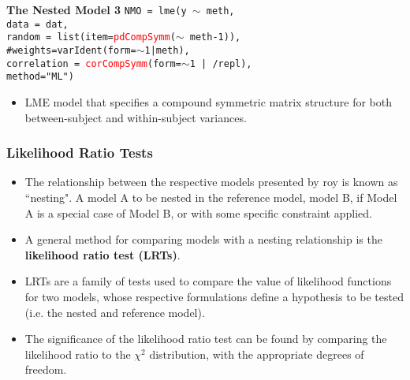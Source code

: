 \documentclass[compress]{beamer}        %
\makeatletter
\newcommand{\tcb}{\textcolor{beamer@blendedblue}}
\newcommand{\tcr}{\textcolor{red}}
\makeatother
\begin{document}
\begin{frame}[fragile]{\bf \tcb{The Nested Model 3}}
\texttt{NMO = lme(y $\sim$ meth,\\
   \hspace{0.6cm} data = dat,\\
   \hspace{0.6cm} random = list(item=\tcr{pdCompSymm}($\sim$ meth-1)), \\
   \hspace{0.6cm} \tcb{\#weights=varIdent(form=$\sim$1|meth),}\\
   \hspace{0.6cm} correlation = \tcr{corCompSymm}(form=$\sim$1 | /repl),\\
   \hspace{0.6cm} method="ML")}
   \begin{itemize}
\item LME model that specifies a compound symmetric matrix structure for both between-subject and within-subject variances.
\end{itemize}
\end{frame}

\begin{frame}
\frametitle{Likelihood Ratio Tests}
\begin{itemize}
\item The relationship between the respective models presented by \alert{roy} is known as ``nesting".
A model A to be nested in the reference model, model B, if Model A is a special case of Model B, or with some specific constraint applied.
\item 
A general method for comparing models with a nesting relationship is the \textbf{likelihood ratio test (LRTs)}. 
\item LRTs are a family of tests used to compare the value of likelihood functions for two models, whose respective formulations define a hypothesis to be tested (i.e. the nested and reference model). 
\item The significance of the likelihood ratio test can be found by comparing the likelihood ratio to the $\chi^2$ distribution, with the appropriate degrees of freedom.
\end{itemize}
\end{frame}
\end{document}
